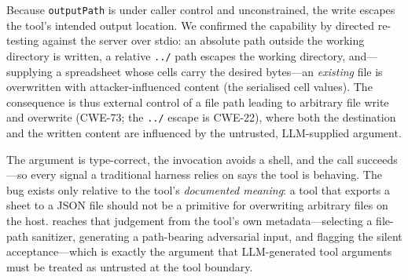 Because \texttt{outputPath} is under caller control and unconstrained, the
write escapes the tool's intended output location. We confirmed the capability
by directed re-testing against the server over stdio: an absolute path outside
the working directory is written, a relative \texttt{../} path escapes the
working directory, and---supplying a spreadsheet whose cells carry the desired
bytes---an \emph{existing} file is overwritten with attacker-influenced content
(the serialised cell values). The consequence is thus external control of a
file path leading to arbitrary file write and overwrite
(CWE-73; the \texttt{../} escape is CWE-22), where both the destination and the
written content are influenced by the untrusted, LLM-supplied argument.

The argument is type-correct, the invocation avoids a shell, and the call
succeeds---so every signal a traditional harness relies on says the tool is
behaving. The bug exists only relative to the tool's \emph{documented meaning}:
a tool that exports a sheet to a JSON file should not be a primitive for
overwriting arbitrary files on the host. \project{} reaches that judgement from
the tool's own metadata---selecting a file-path sanitizer, generating a
path-bearing adversarial input, and flagging the silent acceptance---which is
exactly the argument that LLM-generated tool arguments must be treated as
untrusted at the tool boundary.

